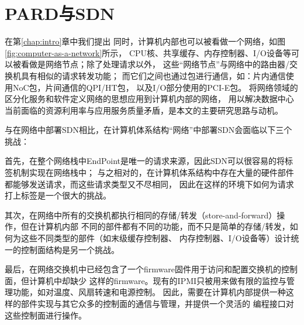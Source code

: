 \section{PARD与SDN}

在第\ref{chap:intro}章中我们提出
同时，计算机内部也可以被看做一个网络，如图\ref{fig:computer-as-a-network}所示，
CPU核、共享缓存、内存控制器、I/O设备等可以被看做是网络节点；除了处理请求以外，
这些“网络节点”与网络中的路由器/交换机具有相似的请求转发功能；
而它们之间也通过包进行通信，如：片内通信使用NoC包，片间通信的QPI/HT包，
以及I/O部分使用的PCI-E包。
将网络领域的区分化服务和软件定义网络的思想应用到计算机内部的网络，
用以解决数据中心当前面临的资源利用率与应用服务质量矛盾，是本文的主要研究思路与动机。

与在网络中部署SDN相比，在计算机体系结构“网络”中部署SDN会面临以下三个挑战：

首先，在整个网络栈中EndPoint是唯一的请求来源，因此SDN可以很容易的将标签机制实现在网络栈中；
与之相对的，在计算机体系结构中存在大量的硬件部件都能够发送请求，而这些请求类型又不尽相同，
因此在这样的环境下如何为请求打上标签是一个很大的挑战。

其次，在网络中所有的交换机都执行相同的存储/转发（store-and-forward）操作，但在计算机内部
不同的部件都有不同的功能，而不只是简单的存储/转发，如何为这些不同类型的部件（如末级缓存控制器、
内存控制器、I/O设备等）设计统一的控制面结构是另一个挑战。

最后，在网络交换机中已经包含了一个firmware固件用于访问和配置交换机的控制面，但计算机中却缺少
这样的firmware。现有的IPMI只被用来做有限的监控与管理功能，如对温度、风扇转速和电源控制。
因此，需要在计算机内部提供一种这样的部件实现与其它众多的控制面的通信与管理，并提供一个灵活的
编程接口对这些控制面进行操作。

\fi
